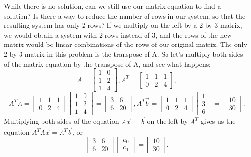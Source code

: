 \begin{example}
While there is no solution, can we still use our matrix equation to find a solution? 
Is there a way to reduce the number of rows in our system, so that the resulting system has only 2 rows? 
If we multiply on the left by a 2 by 3 matrix, we would obtain a system with 2 rows instead of 3, and the rows of the new matrix would be linear combinations of the rows of our original matrix.  
The only 2 by 3 matrix in this problem is the transpose of A.  
So let's multiply both sides of the matrix equation by the transpose of A, and see what happens:
$$A = \begin{bmatrix}1&0\\1&2\\1&4\end{bmatrix}, 
A^T = \begin{bmatrix}1&1&1\\0&2&4\end{bmatrix},$$$$ 
A^T A =\begin{bmatrix}1&1&1\\0&2&4\end{bmatrix}\begin{bmatrix}1&0\\1&2\\1&4\end{bmatrix}= \begin{bmatrix}3&6\\6&20\end{bmatrix}, 
A^T\vec b =  \begin{bmatrix}1&1&1\\0&2&4\end{bmatrix}\begin{bmatrix}1\\3\\6\end{bmatrix} = \begin{bmatrix}10\\30\end{bmatrix}.
$$
Multiplying both sides of the equation $A\vec x = \vec b$ on the left by $A^T$ gives us the equation 
$A^T A \vec x = A^T\vec b$, or 
$$\begin{bmatrix}3&6\\6&20\end{bmatrix} \begin{bmatrix}a_0\\a_1\end{bmatrix}=\begin{bmatrix}10\\30\end{bmatrix}.$$ 

\end{example}
